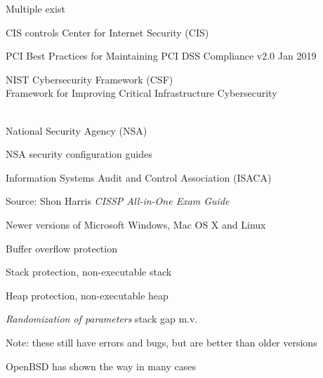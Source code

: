 \documentclass[Screen16to9,17pt]{foils}
\begin{document}
\begin{list1}
\item Multiple exist
\vskip 1cm
\begin{list2}
\item CIS controls Center for Internet Security (CIS) 
\item PCI Best Practices for Maintaining PCI DSS Compliance v2.0 Jan 2019
\item NIST Cybersecurity Framework (CSF)\\
Framework for Improving
Critical Infrastructure Cybersecurity\\ \\
\item National Security Agency (NSA)\\ 
\item NSA security configuration guides\\ 
\item Information Systems Audit and Control Association (ISACA)\\
\end{list2}
\end{list1}




Source: Shon Harris \emph{CISSP All-in-One Exam Guide}



\begin{list1}
\item Newer versions of Microsoft Windows, Mac OS X and Linux
\begin{list2}
\item Buffer overflow protection
\item Stack protection, non-executable stack
\item Heap protection, non-executable heap
\item \emph{Randomization of parameters} stack gap m.v.
\end{list2}
\item Note: these still have errors and bugs, but are better than older versions
\item OpenBSD has shown the way in many cases\\ 
\end{list1}
\end{document}
